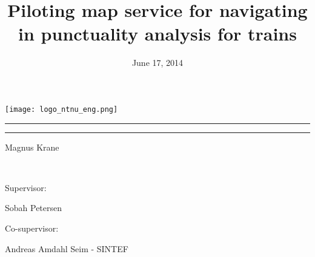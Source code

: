 
\title{Piloting map service for navigating in punctuality analysis for trains}
 
\date{ June 17, 2014}


\begin{titlepage}
\begin{center}

\vspace{10mm}
\texttt{[image: logo\_ntnu\_eng.png]}~\\[1cm]
 \vspace{40mm}

\makeatletter
    \parindent \z@
    \reset@font
    \p@
    \par
    \hrule height 2pt
    \par
    \p@
    \huge \@title
    \p@
    \par
    \hrule height 2pt
    \par
    \begin{flushright}
      \large \@date \par
    \end{flushright}
    \p@
 \vspace{20mm}
\begin{minipage}{0.4\textwidth}
\begin{flushleft} \large
\centerline{Magnus Krane}
~\\
\centerline{Supervisor:}
\centerline{Sobah Petersen}
\centerline{Co-supervisor:}
\centerline{Andreas Amdahl Seim - SINTEF}
\end{flushleft}
\end{minipage}
 
\vfill
\end{center}
\end{titlepage}
